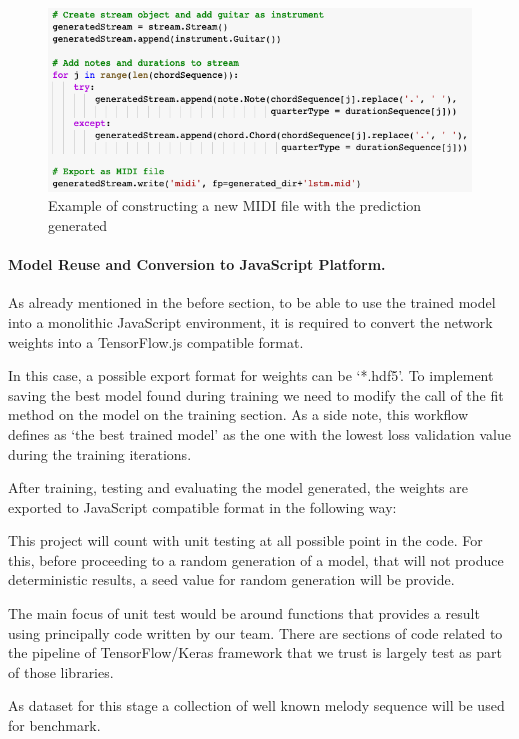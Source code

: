 \begin{figure}[h!]
  \includegraphics[width=\linewidth]{image/fig_JDF25.png}
  \caption{Example of constructing a new MIDI file with the prediction generated}
\end{figure}


\paragraph{Model Reuse and Conversion to JavaScript Platform.} As already mentioned in the
before section, to be able to use the trained model into a monolithic JavaScript
environment, it is required to convert the network weights into a TensorFlow.js compatible
format.

In this case, a possible export format for weights can be ‘*.hdf5’. To implement saving
the best model found during training we need to modify the call of the fit method on the
model on the training section. As a side note, this workflow defines as ‘the best trained
model’ as the one with the lowest loss validation value during the training iterations.

After training, testing and evaluating the model generated, the weights are exported to
JavaScript compatible format in the following way:

This project will count with unit testing at all possible point in the code. For this,
before proceeding to a random generation of a model, that will not produce deterministic
results, a seed value for random generation will be provide.

The main focus of unit test would be around functions that provides a result using
principally code written by our team. There are sections of code related to the pipeline
of TensorFlow/Keras framework that we trust is largely test as part of those libraries.

As dataset for this stage a collection of well known melody sequence will be used for
benchmark.

